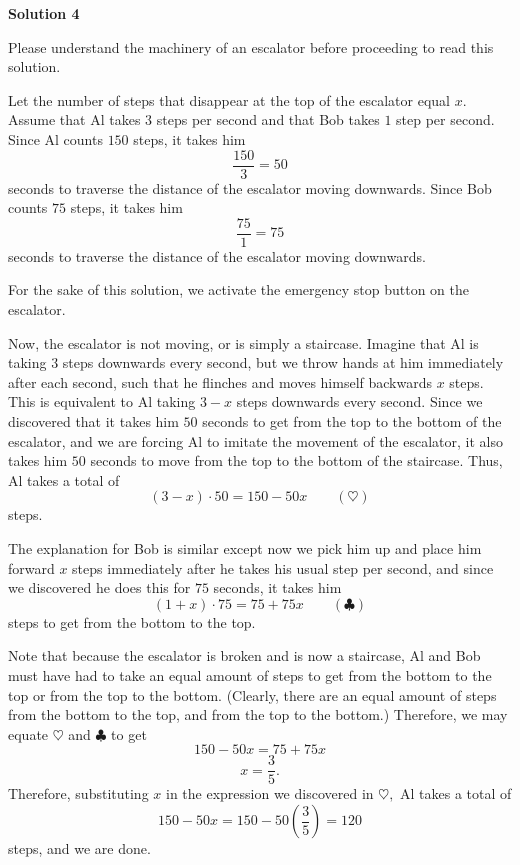 \begin{enumerate}
 



\textbf{Solution 4}

Please understand the machinery of an escalator before proceeding to read this solution.

 Let the number of steps that disappear at the top of the escalator equal $x.$ Assume that Al takes $3$ steps per second and that Bob takes $1$ step per second. Since Al counts $150$ steps, it takes him 
 \[\frac{150}{3}=50\] seconds to traverse the distance of the escalator moving downwards. Since Bob counts $75$ steps, it takes him 
 \[\frac{75}{1}=75\] seconds to traverse the distance of the escalator moving downwards.

 For the sake of this solution, we activate the emergency stop button on the escalator.

 Now, the escalator is not moving, or is simply a staircase. Imagine that Al is taking $3$ steps downwards every second, but we throw hands at him immediately after each second, such that he flinches and moves himself backwards $x$ steps. This is equivalent to Al taking $3-x$ steps downwards every second. Since we discovered that it takes him $50$ seconds to get from the top to the bottom of the escalator, and we are forcing Al to imitate the movement of the escalator, it also takes him $50$ seconds to move from the top to the bottom of the staircase. Thus, Al takes a total of 
 \[(3-x) \cdot 50=150-50x \qquad (\heartsuit)\] steps.

 The explanation for Bob is similar except now we pick him up and place him forward $x$ steps immediately after he takes his usual step per second, and since we discovered he does this for $75$ seconds, it takes him 
 \[(1+x) \cdot 75=75+75x \qquad (\clubsuit)\] steps to get from the bottom to the top. 

 
Note that because the escalator is broken and is now a staircase, Al and Bob must have had to take an equal amount of steps to get from the bottom to the top or from the top to the bottom. (Clearly, there are an equal amount of steps from the bottom to the top, and from the top to the bottom.) Therefore, we may equate $\heartsuit$ and $\clubsuit$ to get 
 \[150-50x=75+75x\] 
 \[x=\frac{3}{5}.\] Therefore, substituting $x$ in the expression we discovered in $\heartsuit,$ Al takes a total of 
 \[150-50x=150-50\left(\frac{3}{5}\right)=\boxed{120}\] steps, and we are done.

 




\end{enumerate}
